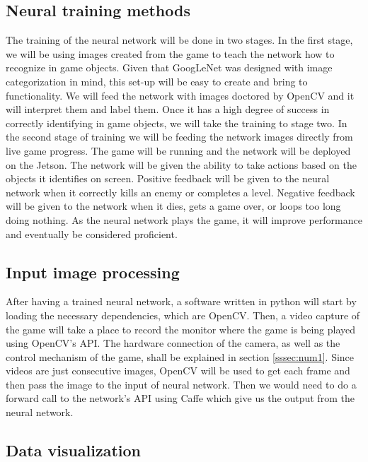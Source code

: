 \documentclass[onecolumn, draftclsnofoot,10pt, compsoc]{IEEEtran}
\begin{document}
\subsection{Neural training methods}%

The training of the neural network will be done in two stages.
In the first stage, we will be using images created from the game to teach the network how to recognize in game objects.
Given that GoogLeNet was designed with image categorization in mind, this set-up will be easy to create and bring to functionality.
We will feed the network with images doctored by OpenCV and it will interpret them and label them.
Once it has a high degree of success in correctly identifying in game objects, we will take the training to stage two.
\newline
\newline
In the second stage of training we will be feeding the network images directly from live game progress.
The game will be running and the network will be deployed on the Jetson.
The network will be given the ability to take actions based on the objects it identifies on screen.
Positive feedback will be given to the neural network when it correctly kills an enemy or completes a level.
Negative feedback will be given to the network when it dies, gets a game over, or loops too long doing nothing.
As the neural network plays the game, it will improve performance and eventually be considered proficient.

\subsection{Input image processing}%

After having a trained neural network, a software written in python will start by loading the necessary dependencies, which are OpenCV.
Then, a video capture of the game will take a place to record the monitor where the game is being played using OpenCV's API.
The hardware connection of the camera, as well as the control mechanism of the game, shall be explained in section \ref{sssec:num1}.
Since videos are just consecutive images, OpenCV will be used to get each frame and then pass the image to the input of neural network.
Then we would need to do a forward call to the network's API using Caffe which give us the output from the neural network.

\subsection{Data visualization}%
\end{document}
